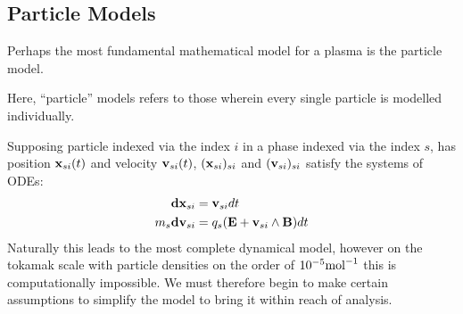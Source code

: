\subsection*{Particle Models}
    Perhaps the most fundamental mathematical model for a plasma is the particle model.
    \begin{definition}
        Here, ``particle'' models refers to those wherein every single particle is modelled individually.
    \end{definition}
    Supposing particle indexed via the index $i$ in a phase indexed via the index $s$, has position $\mathbf{x}_{si}(t)$ and velocity $\mathbf{v}_{si}(t)$, $(\mathbf{x}_{si})_{si}$ and $(\mathbf{v}_{si})_{si}$ satisfy the systems of ODEs:
    \begin{align}
        \mathbf{d}\mathbf{x}_{si}  &=  \mathbf{v}_{si} dt  \label{patricle motion}  \\
        m_{s}\mathbf{d}\mathbf{v}_{si}  &=  q_{s}(\mathbf{E} + \mathbf{v}_{si}\wedge\mathbf{B})dt  \label{particle forcing}
    \end{align}
     Naturally this leads to the most complete dynamical model, however on the tokamak scale with particle densities on the order of $10^{- 5}{\rm mol}^{- 1}$ this is computationally impossible. We must therefore begin to make certain assumptions to simplify the model to bring it within reach of analysis.
    